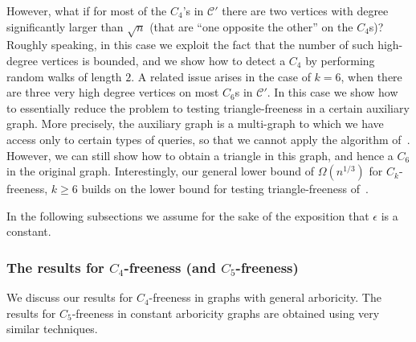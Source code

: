 \documentclass{article}
\newcommand{\eps}{\epsilon}
\newcommand{\calC}{{\mathcal{C}}}
\newcommand{\commentt}[1]{ {}}
\newcommand{\ICALPCR}[1]{{#1}}
\begin{document}
However, what if for most of the $C_4$'s in $\calC'$ there are two vertices with degree significantly larger than $\sqrt{n}$ (that are ``one opposite the other'' on the $C_4$s)? Roughly speaking, in this case we exploit the fact that the number of such high-degree vertices is bounded, and we show how to detect a $C_4$ by performing random walks of length $2$. A related issue arises in the case of $k=6$, when there are three very high degree vertices on most $C_6$s in $\calC'$. In this case we show how to essentially reduce the problem to testing triangle-freeness in a certain auxiliary graph. 
%
More precisely, the auxiliary graph is a multi-graph to which we have access only to certain types of queries, so that we cannot apply the algorithm of~\cite{AKKR08}. However, we can still show how to obtain a triangle in this graph, and hence a $C_6$ in the original graph. Interestingly, our general lower bound of $\Omega(n^{1/3})$ for $C_k$-freeness, $k\geq 6$ builds on the lower bound for testing triangle-freeness of~\cite{AKKR08}.


\smallskip
In the following subsections we assume for the sake of the exposition that $\eps$ is a constant. 



\subsubsection{The  results for $C_4$-freeness (and $C_5$-freeness)}
We discuss our results for $C_4$-freeness in graphs with general arboricity. 
The results for $C_5$-freeness in constant arboricity graphs are obtained using very similar techniques. 
\end{document}
